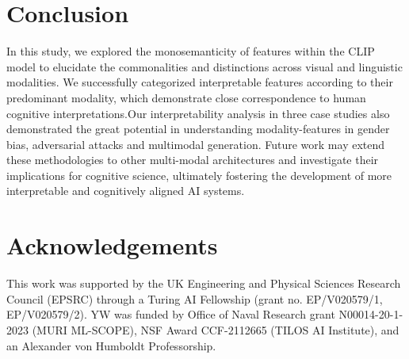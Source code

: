 \section{Conclusion}
In this study, we explored the monosemanticity of features within the CLIP model to elucidate the commonalities and distinctions across visual and linguistic modalities. 
We successfully categorized interpretable features according to their predominant modality, which demonstrate close correspondence to human cognitive interpretations.Our interpretability analysis in three case studies also demonstrated the great potential in understanding modality-features in gender bias, adversarial attacks and multimodal generation. Future work may extend these methodologies to other multi-modal architectures and investigate their implications for cognitive science, ultimately fostering the development of more interpretable and cognitively aligned AI systems. 

\section*{Acknowledgements}
This work was supported by the UK Engineering and Physical Sciences Research Council (EPSRC) through a Turing AI Fellowship (grant no. EP/V020579/1, EP/V020579/2). YW was funded by
Office of Naval Research grant N00014-20-1-2023 (MURI ML-SCOPE), NSF Award CCF-2112665
(TILOS AI Institute), and an Alexander von Humboldt Professorship.